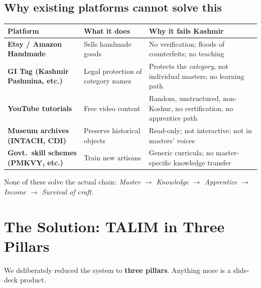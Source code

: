 \documentclass[11pt, a4paper]{article}
\begin{document}
\subsection{Why existing platforms cannot solve this}

\begin{center}
\small
\begin{tabularx}{\linewidth}{>{\bfseries}lXX}
\toprule
Platform & What it does & Why it fails Kashmir \\
\midrule
Etsy / Amazon Handmade & Sells handmade goods & No verification; floods of counterfeits; no teaching \\
GI Tag (Kashmir Pashmina, etc.) & Legal protection of category names & Protects the {\itshape category}, not individual masters; no learning path \\
YouTube tutorials & Free video content & Random, unstructured, non-Koshur, no certification, no apprentice path \\
Museum archives (INTACH, CDI) & Preserve historical objects & Read-only; not interactive; not in masters' voices \\
Govt.\ skill schemes (PMKVY, etc.) & Train new artisans & Generic curricula; no master-specific knowledge transfer \\
\bottomrule
\end{tabularx}
\end{center}

None of these solve the actual chain: \textit{Master $\to$ Knowledge $\to$ Apprentice $\to$ Income $\to$ Survival of craft.}

\section{The Solution: TALIM in Three Pillars}

We deliberately reduced the system to \textbf{three pillars}. Anything more is a slide-deck product.
\end{document}
